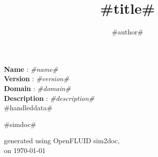 \documentclass[a4paper,10pt]{article}
\title{#title#}
\author{#author#}
\date{}
\begin{document}
\maketitle

\noindent \textbf{Name} : \textit{#name#}\\
\noindent \textbf{Version} : \textit{#version#}\\
\noindent \textbf{Domain} : \textit{#domain#}\\
\noindent \textbf{Description} : \textit{#description#}\\

#handleddata#

\bigskip
\bigskip

\begin{multicols}{2}

#simdoc#

\end{multicols}

\bigskip
\bigskip
\small
\begin{flushright}generated using OpenFLUID sim2doc,\\
on \today\end{flushright}
\small
\end{document}
